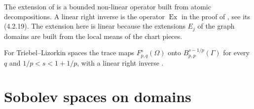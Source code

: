 The extension of \cite[Theorem 4.10]{SchneiderVybiral} is a bounded non-linear operator built
from atomic decompositions. A linear right inverse is the operator $\operatorname{Ex}$ in the
proof of \cite[Theorem 1.1.3(i)]{Mayboroda2005}, see its (4.2.19). The extension here is linear
because the extensions $E_j$ of the graph domains are built from the local means of the chart
pieces.

For Triebel--Lizorkin spaces the trace maps $F^s_{p,q}(\Omega)$ onto
$B^{s-1/p}_{p,p}(\Gamma)$ for every $q$ and $1/p < s < 1 + 1/p$, with a linear right inverse
\cite[Theorem 1.1.3(ii)]{Mayboroda2005}.

\chapter{Sobolev spaces on domains}
\label{ch:sobolev-domains}

